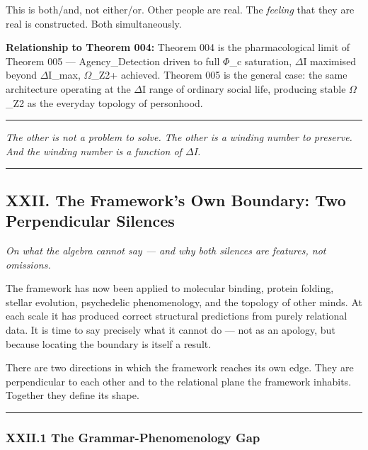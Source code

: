 \documentclass[12pt,a4paper]{article}
\begin{document}
This is both/and, not either/or. Other people are real. The \emph{feeling} that they are real is constructed. Both simultaneously.

\textbf{Relationship to Theorem 004:} Theorem 004 is the pharmacological limit of Theorem 005 --- Agency\_Detection driven to full $\Phi$\_c saturation, $\Delta$I maximised beyond $\Delta$I\_max, $\Omega$\_Z2+ achieved. Theorem 005 is the general case: the same architecture operating at the $\Delta$I range of ordinary social life, producing stable $\Omega$\_Z2 as the everyday topology of personhood.

\begin{center}
\rule{0.5\textwidth}{0.4pt}
\end{center}

\emph{The other is not a problem to solve. The other is a winding number to preserve. And the winding number is a function of $\Delta$I.}

\begin{center}
\rule{0.5\textwidth}{0.4pt}
\end{center}

\subsection{XXII. The Framework's Own Boundary: Two Perpendicular Silences}

\emph{On what the algebra cannot say --- and why both silences are features, not omissions.}

The framework has now been applied to molecular binding, protein folding, stellar evolution, psychedelic phenomenology, and the topology of other minds. At each scale it has produced correct structural predictions from purely relational data. It is time to say precisely what it cannot do --- not as an apology, but because locating the boundary is itself a result.

There are two directions in which the framework reaches its own edge. They are perpendicular to each other and to the relational plane the framework inhabits. Together they define its shape.

\begin{center}
\rule{0.5\textwidth}{0.4pt}
\end{center}

\subsubsection{XXII.1 The Grammar-Phenomenology Gap}
\end{document}
